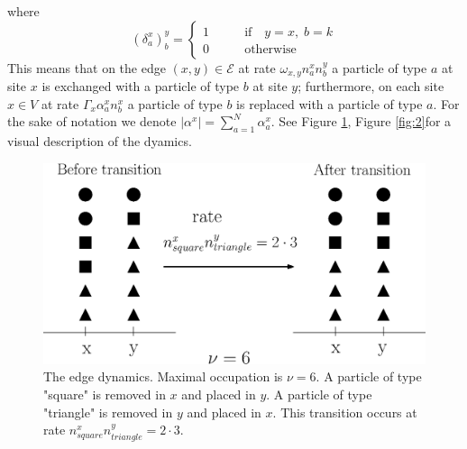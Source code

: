 \documentclass[11pt]{article}
\numberwithin{equation}{section}
\numberwithin{equation}{subsection}
\begin{document}
where 
\begin{equation}
(\delta_{a}^{x})^{y}_{b}=\begin{cases}
1\qquad &\text{if}\quad y=x,\;b=k\\
0\qquad &\text{otherwise}
\end{cases}
\end{equation}
This means that on the edge $(x,y)\in \mathcal{E}$ at rate $\omega_{x,y}n_{a}^{x}n_{b}^{y}$ a particle of type $a$ at site $x$ is exchanged with a particle of type $b$ at site $y$; furthermore, on each site $x\in V$ at rate $\Gamma_{x}\alpha_{a}^{x}n_{b}^{x}$ a particle of type $b$ is replaced with a particle of type $a$. For the sake of notation we denote $|\alpha^{x}|=\sum_{a=1}^{N}\alpha_{a}^{x}$. 
See Figure \ref{fig:1}, Figure \ref{fig:2}for a visual description of the dyamics. 
\begin{figure}
    \centering
    \includegraphics[scale=0.45]{BulkStirring.eps}
    \caption{The edge dynamics. Maximal occupation is $\nu=6$. A particle of type "square" is removed in $x$ and placed in $y$. A particle of type "triangle" is removed in $y$ and placed in $x$. This transition occurs at rate $n_{square}^{x}n_{triangle}^{y}=2\cdot 3$.}
    \label{fig:1}
\end{figure}
\end{document}
